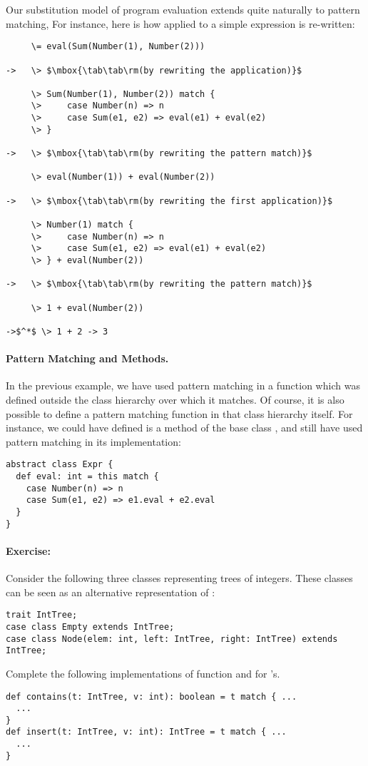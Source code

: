 \documentclass[11pt]{book}
\newcommand{\exercise}{\paragraph{Exercise:}}
\begin{document}
\example Our substitution model of program evaluation extends quite naturally to pattern matching, For instance, here is how \verb@eval@ applied to a simple expression is re-written:
\begin{verbatim}
     \= eval(Sum(Number(1), Number(2)))

->   \> $\mbox{\tab\tab\rm(by rewriting the application)}$

     \> Sum(Number(1), Number(2)) match {
     \>     case Number(n) => n
     \>     case Sum(e1, e2) => eval(e1) + eval(e2)
     \> }

->   \> $\mbox{\tab\tab\rm(by rewriting the pattern match)}$

     \> eval(Number(1)) + eval(Number(2))

->   \> $\mbox{\tab\tab\rm(by rewriting the first application)}$

     \> Number(1) match {
     \>     case Number(n) => n
     \>     case Sum(e1, e2) => eval(e1) + eval(e2)
     \> } + eval(Number(2))

->   \> $\mbox{\tab\tab\rm(by rewriting the pattern match)}$

     \> 1 + eval(Number(2))

->$^*$ \> 1 + 2 -> 3
\end{verbatim}

\paragraph{Pattern Matching and Methods.} In the previous example, we have used pattern
matching in a function which was defined outside the class hierarchy
over which it matches.  Of course, it is also possible to define a
pattern matching function in that class hierarchy itself. For
instance, we could have defined
\verb@eval@ is a method of the base class \verb@Expr@, and still have used pattern matching in its implementation:
\begin{verbatim}
abstract class Expr { 
  def eval: int = this match { 
    case Number(n) => n
    case Sum(e1, e2) => e1.eval + e2.eval 
  } 
}
\end{verbatim}

\exercise
Consider the following three classes representing trees of integers. 
These classes can be seen as an alternative representation of \verb@IntSet@:
\begin{verbatim}
trait IntTree;
case class Empty extends IntTree;
case class Node(elem: int, left: IntTree, right: IntTree) extends IntTree;
\end{verbatim}
Complete the following implementations of function \verb@contains@ and \verb@insert@ for 
\verb@IntTree@'s.
\begin{verbatim} 
def contains(t: IntTree, v: int): boolean = t match { ... 
  ...
}
def insert(t: IntTree, v: int): IntTree = t match { ... 
  ...
}
\end{verbatim}
\end{document}
